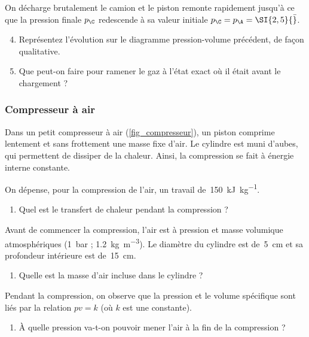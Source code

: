 	On décharge brutalement le camion et le piston remonte rapidement jusqu’à ce que la pression finale $p_\C$ redescende à sa valeur initiale $p_\C = p_\A = \SI{2,5}{\bar}$.
	
	\begin{enumerate}
		\setcounter{enumi}{3}
		\item Représentez l’évolution sur le diagramme pression-volume précédent, de façon qualitative.
		\item Que peut-on faire pour ramener le gaz à l’état exact où il était avant le chargement ?
	\end{enumerate}


\subsubsection{Compresseur à air}
\label{exo_compresseur_air}

	Dans un petit compresseur à air (\cref{fig_compresseur}), un piston comprime lentement et sans frottement une masse fixe d’air. Le cylindre est muni d’aubes, qui permettent de dissiper de la chaleur. Ainsi, la compression se fait à énergie interne constante.	

	On dépense, pour la compression de l’air, un travail de~\SI{150}{\kilo\joule\per\kilogram}.
		
	\begin{enumerate}
		\item Quel est le transfert de chaleur pendant la compression ?
	\end{enumerate}
	
	Avant de commencer la compression, l’air est à pression et masse volumique atmosphériques (\SI{1}{\bar} ; \SI{1,2}{\kilogram\per\metre\cubed}). Le diamètre du cylindre est de~\SI{5}{\centi\metre} et sa profondeur intérieure est de~\SI{15}{\centi\metre}.
	
	\begin{enumerate}
		\item Quelle est la masse d’air incluse dans le cylindre ?
	\end{enumerate}

	Pendant la compression, on observe que la pression et le volume spécifique sont liés par la relation $p v = k$ (où $k$ est une constante).

	\begin{enumerate}
		\item À quelle pression va-t-on pouvoir mener l’air à la fin de la compression ?
	\end{enumerate}

